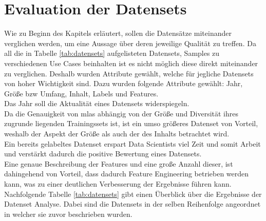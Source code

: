\documentclass[
    12pt, %
    DIV10,
    ngerman, %
    a4paper, %
    oneside, %
    titlepage, %
    parskip=half, %
    headings=normal, %
    listof=totoc, %
    bibliography=totoc, %
    index=totoc, %
    captions=tableheading, %
    final %
]{scrreprt}
\begin{document}
\section{Evaluation der Datensets}
Wie zu Beginn des Kapitels erläutert, sollen die Datensätze miteinander verglichen werden, um eine Aussage über deren jeweilige Qualität zu treffen. Da all die in Tabelle \ref{tab:datensets} aufgelisteten Datensets, Samples zu verschiedenen Use Cases beinhalten ist es nicht möglich diese direkt miteinander zu verglichen. Deshalb wurden Attribute gewählt, welche für jegliche Datensets von hoher Wichtigkeit sind. Dazu wurden folgende Attribute gewählt: Jahr, Größe bzw Umfang, Inhalt, Labels und Features.\\
Das Jahr soll die Aktualität eines Datensets widerspiegeln.\\
Da die Genauigkeit von \ac{mlas} abhängig von der Größe und Diversität ihres zugrunde liegenden Trainingssets ist, ist ein umso größeres Datenset von Vorteil, weshalb der Aspekt der Größe als auch der des Inhalts betrachtet wird.\\
Ein bereits gelabeltes Datenset erspart Data Scientists viel Zeit und somit Arbeit und verstärkt dadurch die positive Bewertung eines Datensets.\\
Eine genaue Beschreibung der Features und eine große Anzahl dieser, ist dahingehend von Vorteil, dass dadurch Feature Engineering betrieben werden kann, was zu einer deutlichen Verbesserung der Ergebnisse führen kann.\\
Nachfolgende Tabelle \ref{tab:datensets} gibt einen Überblick über die Ergebnisse der Datenset Analyse. Dabei sind die Datensets in der selben Reihenfolge angeordnet in welcher sie zuvor beschrieben wurden.
\end{document}
